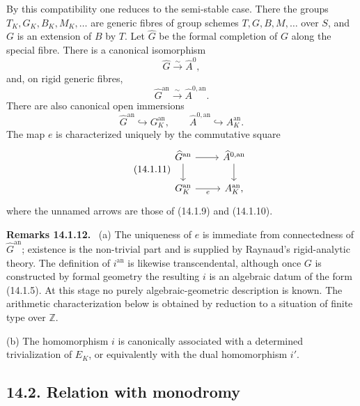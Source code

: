 \documentclass[12pt]{article}
\providecommand{\Z}{\mathbb Z}
\providecommand{\an}{\mathrm{an}}
\newenvironment{remarktext}[1]{\par\medskip\noindent\textbf{#1.}\ }{\par\medskip}
\begin{document}
By this compatibility one reduces to the semi-stable case.  There the groups $T_K,G_K,B_K,M_K,
\ldots$ are generic fibres of group schemes $T,G,B,M,\ldots$ over $S$, and $G$ is an extension of $B$ by $T$.  Let $\widehat G$ be the formal completion of $G$ along the special fibre.  There is a canonical isomorphism
\begin{equation}\tag{14.1.8}
        \widehat G\xrightarrow{\sim}\widehat A^0,
\end{equation}
and, on rigid generic fibres,
\begin{equation}\tag{14.1.9}
        \widehat G^{\an}\xrightarrow{\sim}\widehat A^{0,\an}.
\end{equation}
There are also canonical open immersions
\begin{equation}\tag{14.1.10}
        \widehat G^{\an}\hookrightarrow G_K^{\an},
        \qquad
        \widehat A^{0,\an}\hookrightarrow A_K^{\an}.
\end{equation}
The map $e$ is characterized uniquely by the commutative square
\begin{equation}\tag{14.1.11}
\begin{tikzcd}
\widehat G^{\an}\arrow[r]\arrow[d]&\widehat A^{0,\an}\arrow[d]\\
G_K^{\an}\arrow[r,"e"']&A_K^{\an},
\end{tikzcd}
\end{equation}
where the unnamed arrows are those of (14.1.9) and (14.1.10).

\begin{remarktext}{Remarks 14.1.12}
(a)  The uniqueness of $e$ is immediate from connectedness of $\widehat G^{\an}$; existence is the non-trivial part and is supplied by Raynaud's rigid-analytic theory.  The definition of $i^{\an}$ is likewise transcendental, although once $G$ is constructed by formal geometry the resulting $i$ is an algebraic datum of the form (14.1.5).  At this stage no purely algebraic-geometric description is known.  The arithmetic characterization below is obtained by reduction to a situation of finite type over $\Z$.

(b)  The homomorphism $i$ is canonically associated with a determined trivialization of $E_K$, or equivalently with the dual homomorphism $i'$.
\end{remarktext}

\subsection*{14.2. Relation with monodromy}
\end{document}
